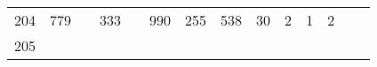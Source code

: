 \documentclass[]{article}
\begin{document}
\begin{longtable}[]{@{}rrrrrrrrrrrrrr@{}}
\begin{minipage}[t]{0.05\columnwidth}\raggedleft\strut
204\strut
\end{minipage} & \begin{minipage}[t]{0.04\columnwidth}\raggedleft\strut
779\strut
\end{minipage} & \begin{minipage}[t]{0.05\columnwidth}\raggedleft\strut
\strut
\end{minipage} & \begin{minipage}[t]{0.04\columnwidth}\raggedleft\strut
333\strut
\end{minipage} & \begin{minipage}[t]{0.05\columnwidth}\raggedleft\strut
\strut
\end{minipage} & \begin{minipage}[t]{0.05\columnwidth}\raggedleft\strut
990\strut
\end{minipage} & \begin{minipage}[t]{0.05\columnwidth}\raggedleft\strut
255\strut
\end{minipage} & \begin{minipage}[t]{0.04\columnwidth}\raggedleft\strut
538\strut
\end{minipage} & \begin{minipage}[t]{0.05\columnwidth}\raggedleft\strut
30\strut
\end{minipage} & \begin{minipage}[t]{0.04\columnwidth}\raggedleft\strut
2\strut
\end{minipage} & \begin{minipage}[t]{0.04\columnwidth}\raggedleft\strut
1\strut
\end{minipage} & \begin{minipage}[t]{0.04\columnwidth}\raggedleft\strut
2\strut
\end{minipage} & \begin{minipage}[t]{0.04\columnwidth}\raggedleft\strut
\strut
\end{minipage} & \begin{minipage}[t]{0.04\columnwidth}\raggedleft\strut
\strut
\end{minipage}\tabularnewline
\begin{minipage}[t]{0.05\columnwidth}\raggedleft\strut
205\strut
\end{minipage} & \begin{minipage}[t]{0.04\columnwidth}\raggedleft\strut
\strut
\end{minipage} & \begin{minipage}[t]{0.05\columnwidth}\raggedleft\strut

\end{minipage}
\end{longtable}
\end{document}
